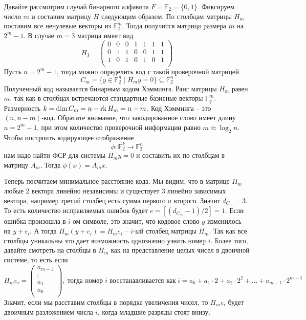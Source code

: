 Давайте рассмотрим случай бинарного алфавита $F = \mathbb F_2 = \{0, 1\}$.
Фиксируем число $m$ и составим матрицу $H$ следующим образом.
По столбцам матрицы $H_m$ поставим все ненулевые векторы из $\mathbb F_2^m$.
Тогда получится матрица размера $m$ на $2^m - 1$.
В случае $m = 3$ матрица имеет вид
\[
H_3 = 
\begin{pmatrix}
{0}&{0}&{0}&{1}&{1}&{1}&{1}\\
{0}&{1}&{1}&{0}&{0}&{1}&{1}\\
{1}&{0}&{1}&{0}&{1}&{0}&{1}\\
\end{pmatrix}
\]
Пусть $n = 2^m - 1$, тогда можно определить код с такой проверочной матрицей
\[
C_m = \{y\in \mathbb F_2^n \mid H_my = 0\}\subseteq \mathbb F_2^n
\]
Полученный код называется бинарным кодом Хэмминга.
Ранг матрицы $H_m$ равен $m$, так как в столбцах встречаются стандартные базисные векторы $\mathbb F_q^m$.
Размерность $k = \dim C_m = n - \operatorname{rk} H_m = n - m$.
Код Хэмминга -- это $(n , n-m)$-код.
Обратите внимание, что закодированное слово имеет длину $n = 2^m - 1$, при этом количество проверочной информации равно $m \approx \log_2 n$.
Чтобы построить кодирующее отображение
\[
\phi\colon \mathbb F_2^{k}\to \mathbb F_2^{n}
\]
нам надо найти ФСР для системы $H_m y = 0$ и составить их по столбцам в матрицу $A_m$.
Тогда $\phi(x) = A_mx$.

Теперь посчитаем минимальное расстояние кода.
Мы видим, что в матрице $H_m$ любые $2$ вектора линейно независимы и существует $3$ линейно зависимых вектора, например третий столбец есть сумма первого и второго.
Значит $d_{C_m} = 3$.
То есть количество исправляемых ошибок будет $e = [(d_{C_m} - 1)/2] = 1$.
Если ошибка произошла в $i$-ом символе, это значит, что кодовое слово $y$ изменилось на $y + e_i$.
А тогда $H_m(y + e_i) = H_me_i$ -- $i$-ый столбец матрицы $H_m$.
Так как все столбцы уникальны это дает возможность однозначно узнать номер $i$.
Более того, давайте смотреть на столбцы в $H_m$ как на представление целых чисел в двоичной системе, то есть если
\[
H_m e_i = 
\begin{pmatrix}
{a_{m-1}}\\{\vdots}\\{a_1}\\{a_0}\\
\end{pmatrix},
\;\text{тогда номер $i$ восстанавливается как}\; i = a_0 + a_1\cdot 2 + a_2 \cdot 2^2 + \ldots + a_{m-1}\cdot 2^{m-1}
\]
Значит, если мы расставим столбцы в порядке увеличения чисел, то $H_m e_i$ будет двоичным разложением числа $i$, когда младшие разряды стоят внизу.

